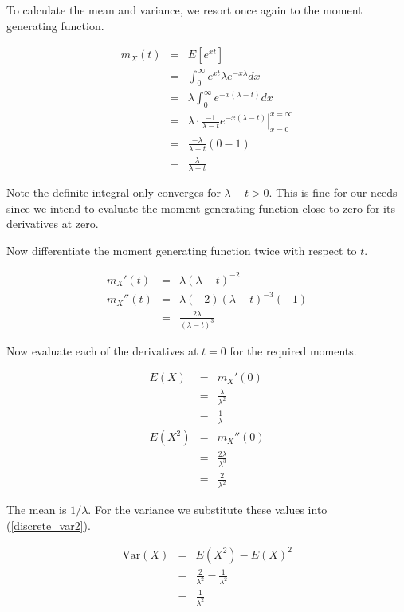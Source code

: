 \documentclass[]{article}
\begin{document}
To calculate the mean and variance, we resort once again to the
moment generating function.

\begin{eqnarray}
m_X(t) & = & E[e^{xt}] \nonumber \\
   & = & \int_0^{\infty} e^{xt} \lambda e^{-x \lambda} dx \nonumber \\
   & = & \lambda \int_0^{\infty} e^{-x(\lambda - t)} dx \nonumber \\
   & = & \left. \lambda \cdot \frac{-1}{\lambda - t} e^{-x(\lambda - t)}
      \right|_{x=0}^{x=\infty} \nonumber \\
   & = & \frac{-\lambda}{\lambda - t} (0 - 1) \nonumber \\
   & = & \frac{\lambda}{\lambda - t} \label{exp_mgf}
\end{eqnarray}

Note the definite integral only converges for $\lambda - t > 0$.
This is fine for our needs since we intend to evaluate the moment
generating function close to zero for its derivatives at zero.

Now differentiate the moment generating function twice with
respect to $t$.

\begin{eqnarray*}
m_X'(t) & = & \lambda(\lambda - t)^{-2}  \\
m_X''(t) & = & \lambda (-2)(\lambda - t)^{-3}(-1) \\
   & = & \frac{2 \lambda}{(\lambda - t)^3}
\end{eqnarray*}

Now evaluate each of the derivatives at $t=0$ for the
required moments.

\begin{eqnarray*}
E(X) & = & m_X'(0) \\
   & = & \frac{\lambda}{\lambda^2} \\
   & = & \frac{1}{\lambda} \label{expon_mean} \\
E(X^2) & = & m_X''(0) \\
   & = & \frac{2 \lambda}{\lambda^3} \\
   & = & \frac{2}{\lambda^2}
\end{eqnarray*}

The mean is $1 / \lambda$.  For the variance we
substitute these values into (\ref{discrete_var2}).

\begin{eqnarray}
\mbox{Var}(X) & = & E(X^2) - E(X)^2 \nonumber \\
   & = & \frac{2}{\lambda^2} - \frac{1}{\lambda^2} \nonumber \\
   & = & \frac{1}{\lambda^2} \label{expon_var}
\end{eqnarray}
\end{document}
